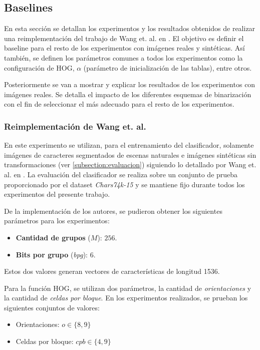 \subsection{Baselines}
\label{subsection:baseline}

	En esta sección se detallan los experimentos y los resultados obtenidos de realizar una reimplementación del trabajo de Wang et. al. en \cite{wang}. El objetivo es definir el baseline para el resto de los experimentos con imágenes reales y sintéticas. Así también, se definen los parámetros comunes a todos los experimentos como la configuración de HOG, $\alpha$ (parámetro de inicialización de las tablas), entre otros.
	
	Posteriormente se van a mostrar y explicar los resultados de los experimentos con imágenes reales. Se detalla el impacto de los diferentes esquemas de binarización con el fin de seleccionar el más adecuado para el resto de los experimentos.
	
	
\subsubsection{Reimplementación de Wang et. al.}

	En este experimento se utilizan, para el entrenamiento del clasificador, solamente imágenes de caracteres segmentados de escenas naturales e imágenes sintéticas sin transformaciones (ver \ref{subsection:evaluacion}) siguiendo lo detallado por Wang et. al. en \cite{wang}. La evaluación del clasificador se realiza sobre un conjunto de prueba proporcionado por el dataset \textit{Chars74k-15} y se mantiene fijo durante todos los experimentos del presente trabajo.
	
	De la implementación de los autores, se pudieron obtener los siguientes parámetros para los experimentos:
	\begin{itemize}
		\item \textbf{Cantidad de grupos} ($M$): $256$.
		\item \textbf{Bits por grupo} (\textit{bpg}): $6$.
	\end{itemize}
	
	Estos dos valores generan vectores de características de longitud 1536.
	
	Para la función HOG,	 se utilizan dos parámetros, la cantidad de \textit{orientaciones} y la cantidad de \textit{celdas por bloque}. En los experimentos realizados, se prueban los siguientes conjuntos de valores:
	
	\begin{itemize}
		\item Orientaciones: $\textit{o} \in \{8, 9\}$
		\item Celdas por bloque: $\textit{cpb} \in \{4, 9\}$
	\end{itemize}
	
